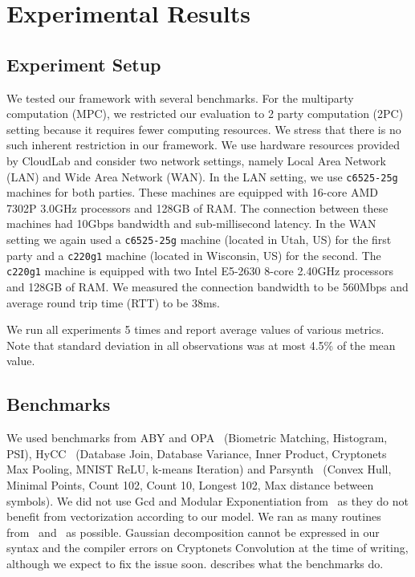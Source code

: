 \section{Experimental Results}
\label{sec:results}

\subsection{Experiment Setup}\label{sec:experiment_setup}
We tested our framework with several benchmarks. For the multiparty computation (MPC), we restricted our evaluation to 2 party computation (2PC) setting because it requires fewer computing resources. We stress that there is no such inherent restriction in our framework. We use hardware resources provided by CloudLab\cite{DuplyakinATC19} and consider two network settings, namely Local Area Network (LAN) and Wide Area Network (WAN). In the LAN setting, we use {\tt c6525-25g} machines for both parties. These machines are equipped with 16-core AMD 7302P 3.0GHz processors and 128GB of RAM. The connection between these machines had 10Gbps bandwidth and sub-millisecond latency. %
In the WAN setting we again used a {\tt c6525-25g} machine (located in Utah, US) for the first party and a {\tt c220g1} machine (located in Wisconsin, US) for the second. The {\tt c220g1} machine is equipped with two Intel E5-2630 8-core 2.40GHz processors and 128GB of RAM. We measured the connection bandwidth to be 560Mbps and average round trip time (RTT) to be 38ms. %

We run all experiments 5 times and report average values of various metrics. Note that standard deviation in all observations was at most 4.5\% of the mean value. %

\subsection{Benchmarks}\label{sec:benchmarks_description}

We used benchmarks from ABY and OPA~\cite{NDSS:DemSchZoh15,Ishaq:2019} (Biometric Matching, Histogram, PSI), HyCC~\cite{CCS:BDKKS18} (Database Join, Database Variance, Inner Product, Cryptonets Max Pooling, MNIST ReLU, k-means Iteration) and Parsynth~\cite{Farzan:2021} (Convex Hull, Minimal Points, Count 102, Count 10, Longest 102, Max distance between symbols). 
We did not use Gcd and Modular Exponentiation from~\cite{Ishaq:2019} as they do not benefit from vectorization according to our model. 
We ran as many routines from~\cite{CCS:BDKKS18} and~\cite{Farzan:2021} as possible. Gaussian decomposition cannot be expressed 
in our syntax and the compiler errors on Cryptonets Convolution at the time of writing, although we expect to fix the issue soon. 
\cite{Anon_TR} describes what the benchmarks do.

